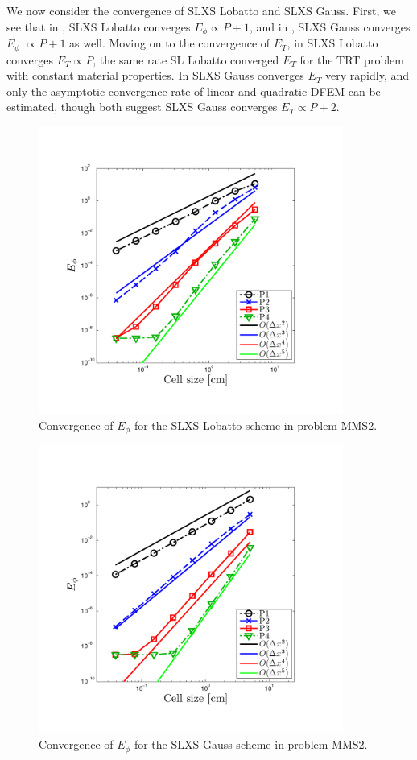 We now consider the convergence of SLXS Lobatto and SLXS Gauss.  First, we see that in , SLXS Lobatto converges $E_{\phi} \propto P+1$, and in , SLXS Gauss converges $E_{\phi}$ $\propto P+1$ as well.
Moving on to the convergence of $E_T$, in  SLXS Lobatto converges $E_T \propto P$, the same rate SL Lobatto converged $E_T$ for the TRT problem with constant material properties.  
In  SLXS Gauss converges $E_T$ very rapidly, and only the asymptotic convergence rate of linear and quadratic DFEM can be estimated, though both suggest SLXS Gauss converges $E_T \propto P+2$.
\begin{figure}[!hbp]
\centering
\includegraphics[width=10cm,trim=0.25in  0.25in 0.75in 0.75in,clip=true]{chapter6_grey_radtran/Dissertation_Data/MMS3_SLXS_Lobatto_phi_L2.pdf}
\caption{Convergence of $E_{\phi}$ for the SLXS Lobatto scheme in problem MMS2.}
\label{fig:mms3_slxs_lobatto_e_phi}
\end{figure}
%
%
\begin{figure}[!htp]
\centering
\includegraphics[width=10cm,trim=0.25in  0.25in 0.75in 0.75in,clip=true]{chapter6_grey_radtran/Dissertation_Data/MMS3_SLXS_Gauss_phi_L2.pdf}
\caption{Convergence of $E_{\phi}$ for the SLXS Gauss scheme in problem MMS2.}
\label{fig:mms3_slxs_gauss_e_phi}
\end{figure}
